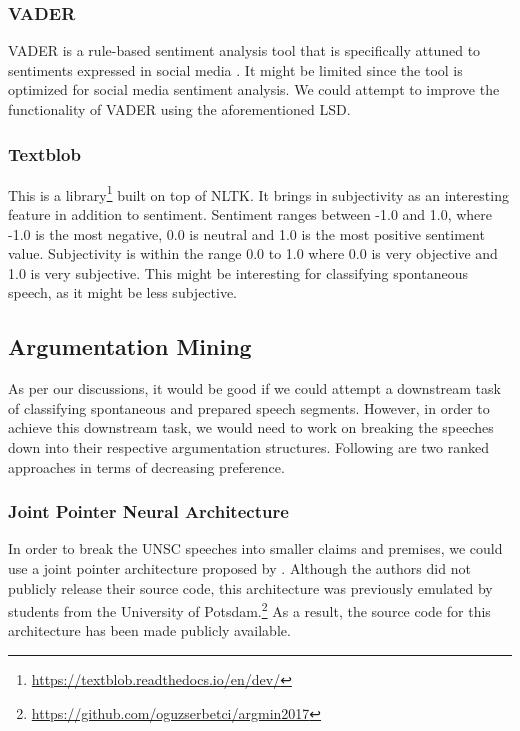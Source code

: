 \documentclass[12pt,a4paper]{article}
\begin{document}
\subsubsection{VADER} 
VADER is a rule-based sentiment analysis tool that is specifically attuned to
sentiments expressed in social media \citep{vader}. It might be limited since the tool is
optimized for social media sentiment analysis. We could attempt to improve the
functionality of VADER using the aforementioned LSD.

\subsubsection{Textblob}

This is a library\footnote{\url{https://textblob.readthedocs.io/en/dev/}} built
on top of NLTK. It brings in subjectivity as an interesting feature in addition
to sentiment. Sentiment ranges between -1.0 and 1.0, where -1.0 is the most
negative, 0.0 is neutral and 1.0 is the most positive sentiment value.
Subjectivity is within the range 0.0 to 1.0 where 0.0 is very objective and 1.0
is very subjective. This might be interesting for classifying spontaneous speech, as it might be less subjective.

\clearpage
\subsection{Argumentation Mining}

As per our discussions, it would be good if we could attempt a downstream task
of classifying spontaneous and prepared speech segments. However, in order to
achieve this downstream task, we would need to work on breaking the speeches
down into their respective argumentation structures. Following are two ranked
approaches in terms of decreasing preference.

\subsubsection{Joint Pointer Neural Architecture}

In order to break the UNSC speeches into smaller claims and premises, we
could use a joint pointer architecture proposed by \citet{potash2016heres}.
Although the authors did not publicly release their source code, this
architecture was previously emulated by students from the University of
Potsdam.\footnote{\url{https://github.com/oguzserbetci/argmin2017}} As a result,
the source code for this architecture has been made publicly available.
\end{document}
